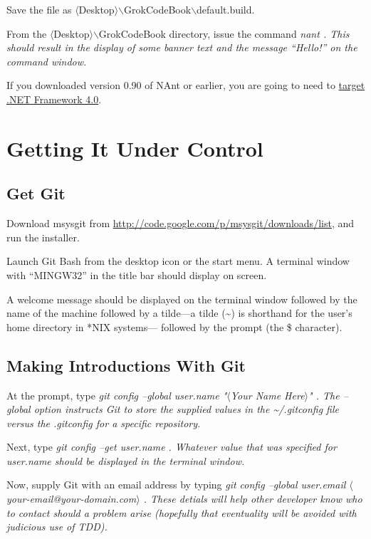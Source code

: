 Save the file as $\langle$Desktop$\rangle$$\backslash$GrokCodeBook$\backslash$default.build.

From the $\langle$Desktop$\rangle$$\backslash$GrokCodeBook directory, issue the command \em nant \em. This should result in the display of some banner text and the message ``Hello!'' on the command window.

If you downloaded version 0.90 of NAnt or earlier, you are going to need to \href{http://paigecsharp.blogspot.com/2009/08/nant-net-framework-40-configuration.html}{target .NET Framework 4.0}.

\section{Getting It Under Control}
\subsection{Get Git}
Download msysgit from \url{http://code.google.com/p/msysgit/downloads/list}, and run the installer.

Launch Git Bash from the desktop icon or the start menu. A terminal window with ``MINGW32'' in the title bar should display on screen.

A welcome message should be displayed on the terminal window followed by the name of the machine followed by a tilde---a tilde (\textasciitilde) is shorthand for the user's home directory in *NIX systems--- followed by the prompt (the \$ character).

\subsection{Making Introductions With Git}
At the prompt, type \em git config --global user.name "$\langle$Your Name Here$\rangle$" \em. The \em --global \em option instructs Git to store the supplied values in the \em \textasciitilde/.gitconfig \em file versus the \em .gitconfig \em for a specific repository.

Next, type \em git config --get user.name \em. Whatever value that was specified for \em user.name \em should be displayed in the terminal window.

Now, supply Git with an email address by typing \em git config --global user.email $\langle$your-email@your-domain.com$\rangle$ \em. These detials will help other developer know who to contact should a problem arise (hopefully that eventuality will be avoided with judicious use of \gls{TDD}).

